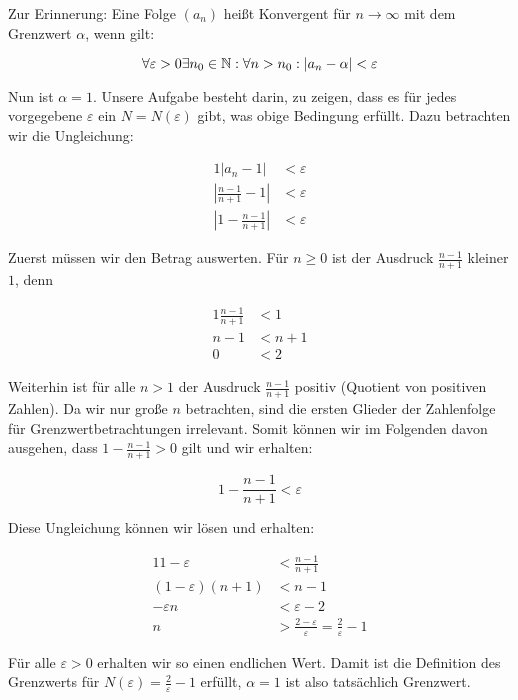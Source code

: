 \item Zur Erinnerung: Eine Folge $(a_n)$ heißt Konvergent für $n\to\infty$ mit dem Grenzwert $\alpha$, wenn gilt:

$$
\forall \varepsilon > 0 \exists n_0\in\mathbb{N}: \forall n > n_0 : |a_n - \alpha| < \varepsilon
$$

Nun ist $\alpha=1$. Unsere Aufgabe besteht darin, zu zeigen, dass es für jedes vorgegebene $\varepsilon$ ein $N=N(\varepsilon)$ gibt, was obige Bedingung erfüllt. Dazu betrachten wir die Ungleichung:

\begin{alignat*}{1}
	|a_n - 1| &< \varepsilon \\
	\left|\frac{n-1}{n+1} - 1\right| &< \varepsilon \\
	\left|1 - \frac{n-1}{n+1}\right| &< \varepsilon	
\end{alignat*}

Zuerst müssen wir den Betrag auswerten. Für $n \ge 0$ ist der Ausdruck $\frac{n-1}{n+1}$ kleiner $1$, denn

\begin{alignat*}{1}
	\frac{n-1}{n+1} &< 1 \\
	n -1 &< n + 1 \\
	0 &< 2
\end{alignat*}


Weiterhin ist für alle $n>1$ der Ausdruck $\frac{n-1}{n+1}$ positiv (Quotient von positiven Zahlen). Da wir nur große $n$ betrachten, sind die ersten Glieder der Zahlenfolge für Grenzwertbetrachtungen irrelevant. Somit können wir im Folgenden davon ausgehen, dass $1 - \frac{n-1}{n+1} > 0$ gilt und wir erhalten:

$$
	1 - \frac{n-1}{n+1} < \varepsilon
$$

Diese Ungleichung können wir lösen und erhalten:

\begin{alignat*}{1}
	1-\varepsilon &< \frac{n-1}{n+1} \\
	(1-\varepsilon)(n+1) &< n -1 \\
	-\varepsilon n &< \varepsilon - 2 \\
	n &> \frac{2-\varepsilon}{\varepsilon} = \frac{2}{\varepsilon} - 1
\end{alignat*}

Für alle $\varepsilon > 0$ erhalten wir so einen endlichen Wert. Damit ist die Definition des Grenzwerts für $N(\varepsilon) = \frac{2}{\varepsilon} - 1$ erfüllt, $\alpha = 1$ ist also tatsächlich Grenzwert.
